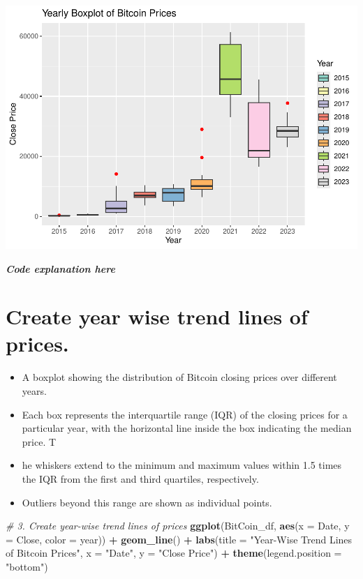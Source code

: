 \documentclass[
]{book}
\newenvironment{Shaded}{\begin{snugshade}}{\end{snugshade}}
\newcommand{\AttributeTok}[1]{\textcolor[rgb]{0.13,0.29,0.53}{#1}}
\newcommand{\CommentTok}[1]{\textcolor[rgb]{0.56,0.35,0.01}{\textit{#1}}}
\newcommand{\FunctionTok}[1]{\textcolor[rgb]{0.13,0.29,0.53}{\textbf{#1}}}
\newcommand{\NormalTok}[1]{#1}
\newcommand{\SpecialCharTok}[1]{\textcolor[rgb]{0.81,0.36,0.00}{\textbf{#1}}}
\newcommand{\StringTok}[1]{\textcolor[rgb]{0.31,0.60,0.02}{#1}}
\providecommand{\tightlist}{%
  \setlength{\itemsep}{0pt}\setlength{\parskip}{0pt}}
\begin{document}
\includegraphics{bookdown-demo_files/figure-latex/unnamed-chunk-10-1.pdf}

\emph{\textbf{Code explanation here}}

\section*{Create year wise trend lines of prices.}\label{create-year-wise-trend-lines-of-prices.}

\begin{itemize}
\tightlist
\item
  A boxplot showing the distribution of Bitcoin closing prices over different years.
\item
  Each box represents the interquartile range (IQR) of the closing prices for a particular year, with the horizontal line inside the box indicating the median price. T
\item
  he whiskers extend to the minimum and maximum values within 1.5 times the IQR from the first and third quartiles, respectively.
\item
  Outliers beyond this range are shown as individual points.
\end{itemize}

\begin{Shaded}
\begin{Highlighting}[]
\CommentTok{\# 3. Create year{-}wise trend lines of prices}
\FunctionTok{ggplot}\NormalTok{(BitCoin\_df, }\FunctionTok{aes}\NormalTok{(}\AttributeTok{x =}\NormalTok{ Date, }\AttributeTok{y =}\NormalTok{ Close, }\AttributeTok{color =}\NormalTok{ year)) }\SpecialCharTok{+}
  \FunctionTok{geom\_line}\NormalTok{() }\SpecialCharTok{+}
  \FunctionTok{labs}\NormalTok{(}\AttributeTok{title =} \StringTok{"Year{-}Wise Trend Lines of Bitcoin Prices"}\NormalTok{, }\AttributeTok{x =} \StringTok{"Date"}\NormalTok{, }\AttributeTok{y =} \StringTok{"Close Price"}\NormalTok{) }\SpecialCharTok{+}
  \FunctionTok{theme}\NormalTok{(}\AttributeTok{legend.position =} \StringTok{"bottom"}\NormalTok{)}
\end{Highlighting}
\end{Shaded}
\end{document}
